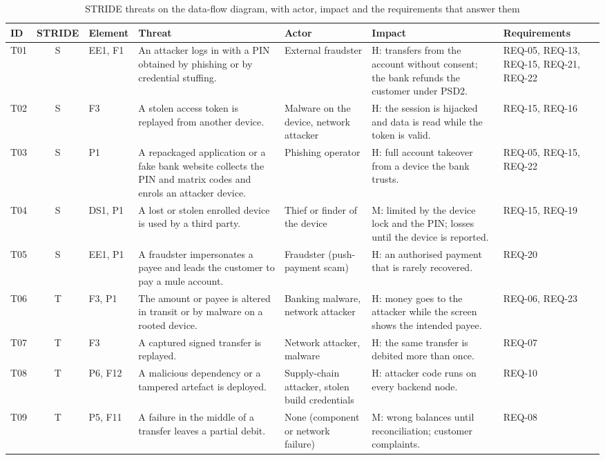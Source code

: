 \begin{table}[!h]
\caption{STRIDE threats on the data-flow diagram, with actor, impact and the requirements that answer them}
\label{tab:threats}
\centering
\scriptsize
\begin{tabularx}{\textwidth}{@{}L{0.55cm}c@{\hspace{5pt}}L{1.1cm}YL{2.5cm}L{4.1cm}L{2.15cm}@{}}
\toprule
\textbf{ID} & \textbf{STRIDE} & \textbf{Element} & \textbf{Threat} & \textbf{Actor} & \textbf{Impact} & \textbf{Requirements} \\
\midrule
T01 & S & EE1, F1 & An attacker logs in with a \ac{PIN} obtained by phishing or by credential stuffing. & External fraudster & H: transfers from the account without consent; the bank refunds the customer under \ac{PSD2}. & REQ-05, REQ-13, REQ-15, REQ-21, REQ-22 \\
T02 & S & F3 & A stolen access token is replayed from another device. & Malware on the device, network attacker & H: the session is hijacked and data is read while the token is valid. & REQ-15, REQ-16 \\
T03 & S & P1 & A repackaged application or a fake bank website collects the \ac{PIN} and matrix codes and enrols an attacker device. & Phishing operator & H: full account takeover from a device the bank trusts. & REQ-05, REQ-15, REQ-22 \\
T04 & S & DS1, P1 & A lost or stolen enrolled device is used by a third party. & Thief or finder of the device & M: limited by the device lock and the \ac{PIN}; losses until the device is reported. & REQ-15, REQ-19 \\
T05 & S & EE1, P1 & A fraudster impersonates a payee and leads the customer to pay a mule account. & Fraudster (push-payment scam) & H: an authorised payment that is rarely recovered. & REQ-20 \\
T06 & T & F3, P1 & The amount or payee is altered in transit or by malware on a rooted device. & Banking malware, network attacker & H: money goes to the attacker while the screen shows the intended payee. & REQ-06, REQ-23 \\
T07 & T & F3 & A captured signed transfer is replayed. & Network attacker, malware & H: the same transfer is debited more than once. & REQ-07 \\
T08 & T & P6, F12 & A malicious dependency or a tampered artefact is deployed. & Supply-chain attacker, stolen build credentials & H: attacker code runs on every backend node. & REQ-10 \\
T09 & T & P5, F11 & A failure in the middle of a transfer leaves a partial debit. & None (component or network failure) & M: wrong balances until reconciliation; customer complaints. & REQ-08 \\

\end{tabularx}
\end{table}
